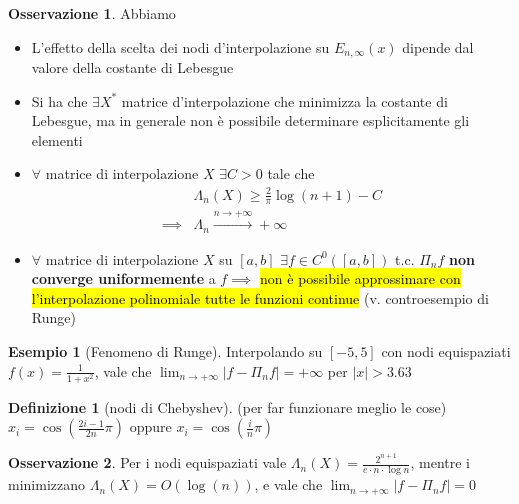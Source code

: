 \documentclass[a4paper,10pt]{article}
\theoremstyle{definition}
\theoremstyle{indentdefinition}
\newtheorem{defn}{Definizione}[section]
\theoremstyle{indenttheorem}
\theoremstyle{myremark}
\newtheorem*{rem*}{Osservazione}
\newtheorem{example*}{Esempio}
\theoremstyle{indentgeneral}
\theoremstyle{plain}
\theoremstyle{plain}
\begin{document}
\begin{rem*} Abbiamo
\begin{itemize}
    \item L'effetto della scelta dei nodi  d'interpolazione su $E_{n,\infty}(x)$ dipende dal valore della costante di Lebesgue
    \item Si ha che $\exists X^*$ matrice d'interpolazione che minimizza la costante di Lebesgue, ma in generale non è possibile determinare esplicitamente gli elementi
    \item $\forall$ matrice di interpolazione $X$ $\exists C>0$ tale che
    \begin{align*}
        &\Lambda_{n}\left(X\right)\geq\frac{2}{\pi}\log\left(n+1\right)-C\\
        \implies &\Lambda_{n}\overset{n\to+\infty}{\longrightarrow}+\infty
    \end{align*}
    \item  $\forall$ matrice di interpolazione $X$ su $[a,b]$ $\exists f\in C^0([a,b])$ t.c. $\Pi_nf$ \textbf{non converge uniformemente} a $f\implies$ \hl{non è possibile approssimare con l'interpolazione polinomiale tutte le funzioni continue} (v. controesempio di Runge)
\end{itemize}

\end{rem*}

\begin{example*}[Fenomeno di Runge]
Interpolando su $\left[-5,5\right]$ con nodi equispaziati $f\left(x\right)=\frac{1}{1+x^{2}}$,
vale che $\lim_{n\rightarrow+\infty}\left|f-\Pi_{n}f\right|=+\infty$
per $\left|x\right|>3.63$
\end{example*}
\begin{defn}[nodi di Chebyshev]  (per  far funzionare meglio le cose)
\label{def:nodi-di-chebyshev}$x_{i}=\cos\left(\frac{2i-1}{2n}\pi\right)$
oppure $x_{i}=\cos\left(\frac{i}{n}\pi\right)$
\end{defn}

\begin{rem*}
Per i nodi equispaziati vale $\Lambda_{n}\left(X\right)=\frac{2^{n+1}}{e\cdot n\cdot\log n}$,
mentre i  minimizzano $\Lambda_{n}\left(X\right)=O\left(\log\left(n\right)\right)$,
e vale che $\lim_{n\rightarrow+\infty}\left|f-\Pi_{n}f\right|=0$
\end{rem*}
\end{document}
